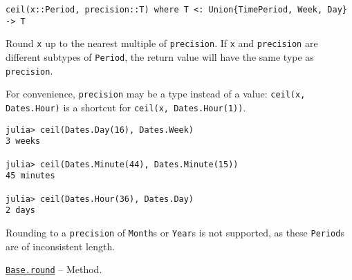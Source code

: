 \begin{adjustwidth}{2em}{0pt}


\begin{verbatim}
ceil(x::Period, precision::T) where T <: Union{TimePeriod, Week, Day} -> T
\end{verbatim}

Round \texttt{x} up to the nearest multiple of \texttt{precision}. If \texttt{x} and \texttt{precision} are different subtypes of \texttt{Period}, the return value will have the same type as \texttt{precision}.

For convenience, \texttt{precision} may be a type instead of a value: \texttt{ceil(x, Dates.Hour)} is a shortcut for \texttt{ceil(x, Dates.Hour(1))}.


\begin{verbatim}
julia> ceil(Dates.Day(16), Dates.Week)
3 weeks

julia> ceil(Dates.Minute(44), Dates.Minute(15))
45 minutes

julia> ceil(Dates.Hour(36), Dates.Day)
2 days
\end{verbatim}

Rounding to a \texttt{precision} of \texttt{Month}s or \texttt{Year}s is not supported, as these \texttt{Period}s are of inconsistent length.



\end{adjustwidth}
\hypertarget{8072707089198522898}{}
\hyperlink{8072707089198522898}{\texttt{Base.round}}  -- {Method.}

